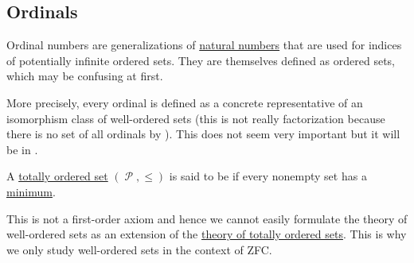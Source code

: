 \subsection{Ordinals}\label{subsec:ordinals}

\begin{remark}\label{rem:ordinal_is_equivalence_class}
  Ordinal numbers are generalizations of \hyperref[def:natural_numbers]{natural numbers} that are used for indices of potentially infinite ordered sets. They are themselves defined as ordered sets, which may be confusing at first.

  More precisely, every ordinal is defined as a concrete representative of an isomorphism class of well-ordered sets (this is not really factorization because there is no set of all ordinals by ). This does not seem very important but it will be in .
\end{remark}

\begin{definition}\label{def:well_ordered_set}
  A \hyperref[def:totally_ordered_set]{totally ordered set} \( (\mscrP, \leq) \) is said to be  if every nonempty set has a \hyperref[def:preordered_set/maximum_and_minimum]{minimum}.

  This is not a first-order axiom and hence we cannot easily formulate the theory of well-ordered sets as an extension of the \hyperref[def:totally_ordered_set]{theory of totally ordered sets}. This is why we only study well-ordered sets in the context of ZFC.
\end{definition}

